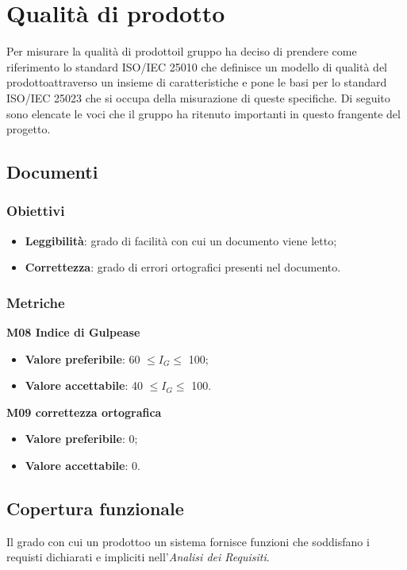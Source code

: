 \section{Qualità di prodotto}
    Per misurare la qualità di prodotto\glosp il gruppo ha deciso di prendere come riferimento lo standard ISO/IEC 25010 che definisce un modello di qualità del prodotto\glosp attraverso un insieme di caratteristiche e pone le basi per lo standard ISO/IEC 25023 che si occupa della misurazione di queste specifiche. Di seguito sono elencate le voci che il gruppo ha ritenuto importanti in questo frangente del progetto\glo.
    \subsection{Documenti}
    	\subsubsection{Obiettivi}
    		\begin{itemize}
    			\item \textbf{Leggibilità}: grado di facilità con cui un documento viene letto;
    			\item \textbf{Correttezza}: grado di errori ortografici presenti nel documento.
    		\end{itemize}
	    \subsubsection{Metriche}
	    \textbf{M08 Indice di Gulpease}
	    \begin{itemize}
	    	\item \textbf{Valore preferibile}: 60 $\le I_{G} \le$ 100;
	    	\item \textbf{Valore accettabile}: 40 $\le I_{G} \le$ 100.
	    \end{itemize}
	    \textbf{M09 correttezza ortografica}
	    \begin{itemize}
	    	\item \textbf{Valore preferibile}: 0;
	    	\item \textbf{Valore accettabile}: 0.
	    \end{itemize}
    \subsection{Copertura funzionale}
        Il grado con cui un prodotto\glosp o un sistema fornisce funzioni che soddisfano i requisti dichiarati e impliciti nell'\textit{Analisi dei Requisiti}.

